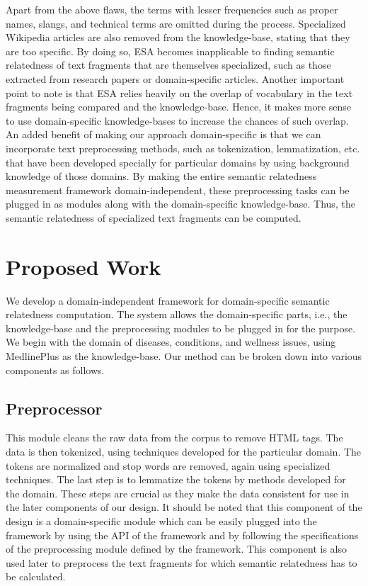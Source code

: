 \documentclass[journal,transmag]{IEEEtran}
\begin{document}
Apart from the above flaws, the terms with lesser frequencies such as proper names, slangs, and technical terms are omitted during the process. Specialized Wikipedia articles are also removed from the knowledge-base, stating that they are too specific. By doing so, ESA becomes inapplicable to finding semantic relatedness of text fragments that are themselves specialized, such as those extracted from research papers or domain-specific articles. Another important point to note is that ESA relies heavily on the overlap of vocabulary in the text fragments being compared and the knowledge-base. Hence, it makes more sense to use domain-specific knowledge-bases to increase the chances of such overlap.\\
An added benefit of making our approach domain-specific is that we can incorporate text preprocessing methods, such as tokenization, lemmatization, etc. that have been developed specially for particular domains by using background knowledge of those domains. By making the entire semantic relatedness measurement framework domain-independent, these preprocessing tasks can be plugged in as modules along with the domain-specific knowledge-base. Thus, the semantic relatedness of specialized text fragments can be computed.


\section{\textbf{Proposed Work}}
We develop a domain-independent framework for domain-specific semantic relatedness computation. The system allows the domain-specific parts, i.e., the knowledge-base and the preprocessing modules to be plugged in for the purpose. We begin with the domain of diseases, conditions, and wellness issues, using MedlinePlus as the knowledge-base.
Our method can be broken down into various components as follows.
\subsection{\textbf{Preprocessor}}
This module cleans the raw data from the corpus to remove HTML tags. The data is then tokenized, using techniques developed for the particular domain. The tokens are normalized and stop words are removed, again using specialized techniques. The last step is to lemmatize the tokens by methods developed for the domain. These steps are crucial as they make the data consistent for use in the later components of our design. It should be noted that this component of the design is a domain-specific module which can be easily plugged into the framework by using the API of the framework and by following the specifications of the preprocessing module defined by the framework. This component is also used later to preprocess the text fragments for which semantic relatedness has to be calculated.
\end{document}
